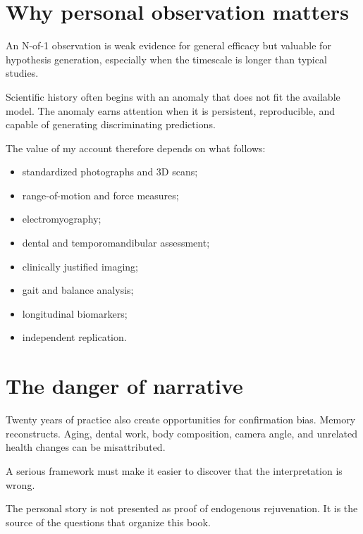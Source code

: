 \section{Why personal observation matters}

An N-of-1 observation is weak evidence for general efficacy but valuable for hypothesis generation, especially when the timescale is longer than typical studies.

Scientific history often begins with an anomaly that does not fit the available model. The anomaly earns attention when it is persistent, reproducible, and capable of generating discriminating predictions.

The value of my account therefore depends on what follows:

\begin{itemize}
\tightlist
\item
  standardized photographs and 3D scans;
\item
  range-of-motion and force measures;
\item
  electromyography;
\item
  dental and temporomandibular assessment;
\item
  clinically justified imaging;
\item
  gait and balance analysis;
\item
  longitudinal biomarkers;
\item
  independent replication.
\end{itemize}

\section{The danger of narrative}

Twenty years of practice also create opportunities for confirmation bias. Memory reconstructs. Aging, dental work, body composition, camera angle, and unrelated health changes can be misattributed.

A serious framework must make it easier to discover that the interpretation is wrong.

The personal story is not presented as proof of endogenous rejuvenation. It is the source of the questions that organize this book.
